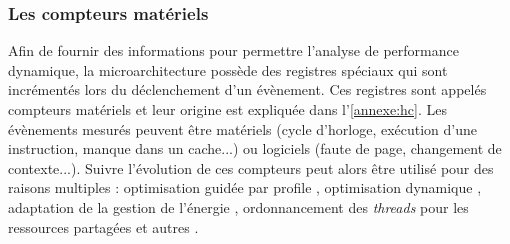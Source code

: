 

    \subsubsection{Les compteurs matériels}
 
        Afin de fournir des informations pour permettre l'analyse de performance dynamique, la microarchitecture possède des registres spéciaux qui sont incrémentés lors du déclenchement d'un évènement. Ces registres sont appelés compteurs matériels et leur origine est expliquée dans l'\autoref{annexe:hc}. Les évènements mesurés peuvent être matériels (cycle d'horloge, exécution d'une instruction, manque dans un cache...) ou logiciels (faute de page, changement de contexte...). Suivre l'évolution de ces compteurs peut alors être utilisé pour des raisons multiples \cite{Moseley2011} : optimisation guidée par profile \cite{Cavazos2006}, optimisation dynamique \cite{Dai2005}, adaptation de la gestion de l'énergie \cite{Isci2005}, ordonnancement des \textit{threads} pour les ressources partagées \cite{Moseley2006} et autres \cite{Shye2005, Shye2008}.
        
